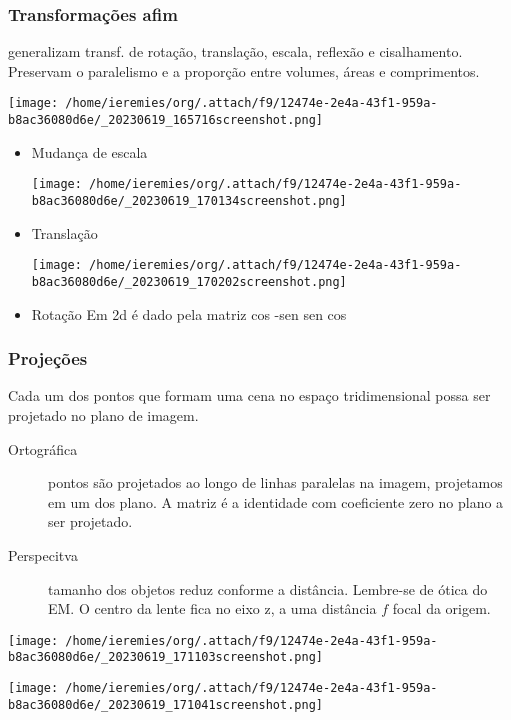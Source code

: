 \documentclass[twocolumn, 9pt]{article}
\begin{document}
\subsubsection*{Transformações afim}
\label{sec:org71574a5}
generalizam transf. de rotação, translação, escala, reflexão e cisalhamento.
Preservam o paralelismo e a proporção entre volumes, áreas e comprimentos.
\begin{center}
\texttt{[image: /home/ieremies/org/.attach/f9/12474e-2e4a-43f1-959a-b8ac36080d6e/\_20230619\_165716screenshot.png]}
\end{center}
\begin{itemize}
\item Mudança de escala
\label{sec:org2a22374}
\begin{center}
\texttt{[image: /home/ieremies/org/.attach/f9/12474e-2e4a-43f1-959a-b8ac36080d6e/\_20230619\_170134screenshot.png]}
\end{center}
\item Translação
\label{sec:orgf02c3de}

\begin{center}
\texttt{[image: /home/ieremies/org/.attach/f9/12474e-2e4a-43f1-959a-b8ac36080d6e/\_20230619\_170202screenshot.png]}
\end{center}

\item Rotação
\label{sec:orgaeda7d2}
Em 2d é dado pela matriz
cos -sen
sen cos
\end{itemize}
\subsubsection*{Projeções}
\label{sec:org1c04c8c}
Cada um dos pontos que formam uma cena no espaço tridimensional possa ser projetado no plano de imagem.
\begin{description}
\item[{Ortográfica}] pontos são projetados ao longo de linhas paralelas na imagem, projetamos em um dos plano. A matriz é a identidade com coeficiente zero no plano a ser projetado.
\item[{Perspecitva}] tamanho dos objetos reduz conforme a distância. Lembre-se de ótica do EM.
O centro da lente fica no eixo z, a uma distância \(f\) focal da origem.
\end{description}
\begin{center}
\texttt{[image: /home/ieremies/org/.attach/f9/12474e-2e4a-43f1-959a-b8ac36080d6e/\_20230619\_171103screenshot.png]}
\end{center}
\begin{center}
\texttt{[image: /home/ieremies/org/.attach/f9/12474e-2e4a-43f1-959a-b8ac36080d6e/\_20230619\_171041screenshot.png]}
\end{center}
\end{document}
